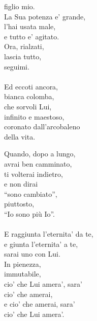 \begin{haiku}
figlio mio.\\
La Sua potenza e' grande,\\
l'hai usata male,\\
e tutto e' agitato.\\
Ora, rialzati,\\
lascia tutto,\\
seguimi.\\
\leavevmode\\
Ed eccoti ancora,\\
bianca colomba,\\
che sorvoli Lui,\\
infinito e maestoso,\\
coronato dall'arcobaleno\\
della vita.\\
\end{haiku}

\begin{haiku}
    Quando, dopo a lungo,\\
avrai ben camminato,\\
ti volterai indietro,\\
e non dirai\\
``sono cambiato'',\\
piuttosto,\\
``Io sono più Io''.\\
\leavevmode\\
E raggiunta l'eternita' da te,\\
e giunta l'eternita' a te,\\
sarai uno con Lui.\\
In pienezza,\\
immutabile,\\
cio' che Lui amera', sara'\\
cio' che amerai,\\
e cio' che amerai, sara'\\
cio' che Lui amera'.\\
\end{haiku}
